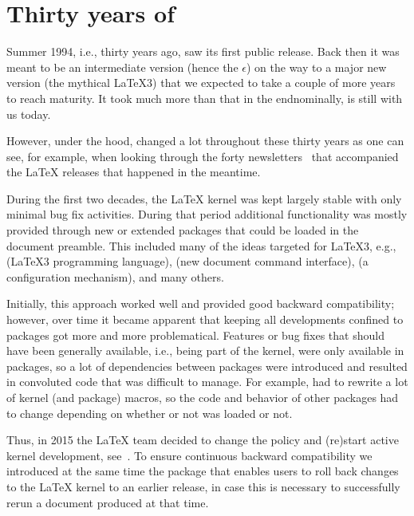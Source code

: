 \documentclass{ltnews}
\providecommand\Dash {\unskip \textemdash}
\begin{document}
\maketitle
{  \spaceskip=3.33pt 
\tableofcontents}

\setlength{}

\medskip


\section{Thirty years of \LaTeXe{}}

Summer 1994, i.e., thirty years ago, \LaTeXe{} saw its first public
release. Back then it was meant to be an intermediate version (hence
the $\epsilon$) on the way to a major new version (the mythical
\LaTeX3) that we expected to take a couple of more years to reach
maturity. It took much more than that in the end\Dash nominally,
\LaTeXe{} is still with us today.

However, under the hood, \LaTeXe{} changed a lot throughout these
thirty years as one can see, for example, when looking through the
forty newsletters~\cite{40:ltnews} that accompanied the \LaTeX{}
releases that happened in the meantime.

During the first two decades, the \LaTeX{} kernel was kept largely
stable with only minimal bug fix activities. During that period
additional functionality was mostly provided through new or
extended packages that could be loaded in the document preamble. This
included many of the ideas targeted for \LaTeX3{}, e.g., 
(\LaTeX3 programming language),  (new document command
interface),  (a configuration mechanism), and many
others.

Initially, this approach worked well and provided good backward
compatibility; however, over time it became apparent that keeping all
developments confined to packages got more and more problematical.
Features or bug fixes that should have been generally available, i.e.,
being part of the kernel, were only available in packages, so a lot of
dependencies between packages were introduced and resulted in
convoluted code that was difficult to manage. For example,
 had to rewrite a lot of kernel (and package) macros, so
the code and behavior of other packages had to change depending on
whether or not  was loaded or not.

Thus, in 2015 the \LaTeX{} team decided to change the policy and
(re)start active kernel development, see~\cite{40:ltnews22}. To ensure
continuous backward compatibility we introduced at the same time the
 package that enables users to roll back changes to
the \LaTeX{} kernel to an earlier release, in case this is necessary
to successfully rerun a document produced at that time.
\end{document}
